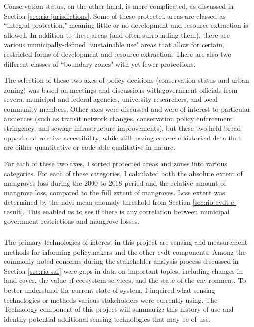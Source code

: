 Conservation status, on the other hand, is more complicated, as discussed in Section \ref{sec:rio-jurisdictions}. Some of these protected areas are classed as ``integral protection," meaning little or no development and resource extraction is allowed. In addition to these areas (and often surrounding them), there are various municipally-defined ``sustainable use" areas that allow for certain, restricted forms of development and resource extraction. There are also two different classes of ``boundary zones" with yet fewer protections.

The selection of these two axes of policy decisions (conservation status and urban zoning) was based on meetings and discussions with government officials from several municipal and federal agencies, university researchers, and local community members. Other axes were discussed and were of interest to particular audiences (such as transit network changes, conservation policy enforcement stringency, and sewage infrastructure improvements), but these two held broad appeal and relative accessibility, while still having concrete historical data that are either quantitative or code-able qualitative in nature. 

For each of these two axes, I sorted protected areas and zones into various categories. For each of these categories, I calculated both the absolute extent of mangroves loss during the 2000 to 2018 period and the relative amount of mangrove loss, compared to the full extent of mangroves. Loss extent was determined by the \ac{ndvi} mean anomaly threshold from Section \ref{sec:rio-evdt-e-result}. This enabled us to see if there is any correlation between municipal government restrictions and mangrove losses.

\subsubsection{}

The primary technologies of interest in this project are sensing and measurement methods for informing policymakers and the other \ac{evdt} components. Among the commonly noted concerns during the stakeholder analysis process discussed in Section \ref{sec:rio-saf} were gaps in data on important topics, including changes in land cover, the value of ecosystem services, and the state of the environment. To better understand the current state of system, I inquired what sensing technologies or methods various stakeholders were currently using. The Technology component of this project will summarize this history of use and identify potential additional sensing technologies that may be of use. 

